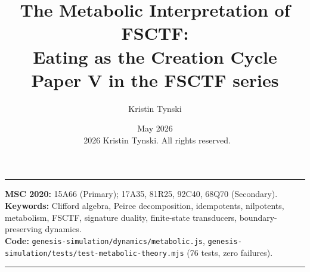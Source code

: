 \documentclass[11pt,a4paper]{article}
\title{The Metabolic Interpretation of FSCTF:\\
Eating as the Creation Cycle\\[4pt]
{\large Paper V in the FSCTF series}}
\author{Kristin Tynski}
\date{May 2026 \\[6pt] {\small\textcopyright\ 2026 Kristin Tynski. All rights reserved.}}
\theoremstyle{plain}
\theoremstyle{definition}
\theoremstyle{remark}
\numberwithin{equation}{section}
\begin{document}
\thispagestyle{empty}
\maketitle

\begin{center}
{\color{accentMuted}\rule{0.55\textwidth}{0.5pt}}
\end{center}

\begin{center}
\footnotesize
\textbf{MSC 2020:} 15A66 (Primary); 17A35, 81R25, 92C40, 68Q70 (Secondary).\\
\textbf{Keywords:} Clifford algebra, Peirce decomposition, idempotents, nilpotents,
metabolism, FSCTF, signature duality, finite-state transducers,
boundary-preserving dynamics.\\
\textbf{Code:} \texttt{genesis-simulation/dynamics/metabolic.js},
\texttt{genesis-simulation/tests/test-metabolic-theory.mjs}
(76 tests, zero failures).
\end{center}
\vspace{0.4em}
\begin{center}
{\color{accentMuted}\rule{0.55\textwidth}{0.5pt}}
\end{center}
\end{document}
